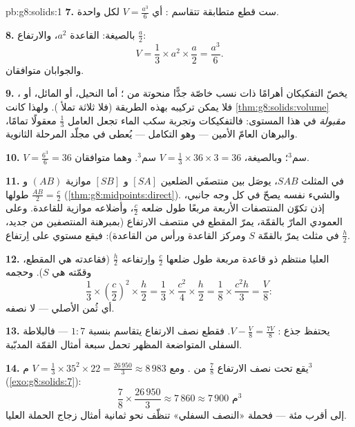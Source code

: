 \begin{solution}{pb:g8:solids:1}
\textbf{7.} ست قطع متطابقة تتقاسم :
أي $V = \frac{a^3}{6}$ لكل واحدة.

\textbf{8.} بالصيغة:  القاعدة $a^2$، والارتفاع $\frac a2$:
\[
V = \frac13 \times a^2 \times \frac{a}{2} = \frac{a^3}{6} .
\]
والجوابان متوافقان.

\textbf{9.} يخصّ التفكيكان أهرامًا ذات نسب
خاصّة جدًّا منحوتة من ؛ أما  النحيل، أو المائل،
أو ، فلا يمكن تركيبه بهذه الطريقة (فلا ثلاثة  تملأ
). ولهذا كانت \cref{thm:g8:solids:volume}
\emph{مقبولة} في هذا المستوى: فالتفكيكات وتجربة
سكب الماء تجعل العامل $\frac13$ معقولًا تمامًا،
والبرهان العامّ الأمين --- وهو التكامل --- يُعطى في
مجلّد المرحلة الثانوية.

\textbf{10.} $V = \frac{6^3}{6} = 36$ سم$^3$؛ وبالصيغة،
$V = \frac13 \times 36 \times 3 = 36$ سم$^3$. وهما متوافقان.

\textbf{11.} في المثلث $SAB$، يوصَل بين منتصفَي الضلعين
$[SA]$ و $[SB]$  موازية  $(AB)$ و
طولها $\frac{AB}{2} = \frac{c}{2}$
(\cref{thm:g8:midpoints:direct}). والشيء نفسه يصحّ في كل وجه
جانبي، إذن تكوّن المنتصفات الأربعة مربعًا طول ضلعه $\frac c2$،
وأضلاعه موازية للقاعدة. وعلى  العمودي المارّ
بالقمّة، يمرّ المقطع في منتصف الارتفاع (بمبرهنة
المنتصفين من جديد، في مثلث يمرّ بالقمّة $S$ ومركز القاعدة ورأس
من القاعدة): فيقع مستوي  على اِرتفاع $\frac h2$.

\textbf{12.}  العليا  منتظم ذو قاعدة مربعة طول
ضلعها $\frac c2$ واِرتفاعه $\frac h2$ (فقاعدته هي المقطع،
وقمّته هي $S$). وحجمه
\[
\frac13 \times \left(\frac c2\right)^2 \times \frac h2
= \frac13 \times \frac{c^2}{4} \times \frac h2
= \frac{1}{8} \times \frac{c^2 h}{3}
= \frac{V}{8} :
\]
أي ثُمن الأصلي --- لا نصفه.

\textbf{13.} يحتفظ جذع  :
$V - \frac V8 = \frac{7V}{8}$. فقطع نصف الارتفاع يتقاسم
 بنسبة $1 : 7$ --- فالبلاطة السفلى المتواضعة المظهر
تحمل سبعة أمثال  القمّة المدبّبة.

\textbf{14.} يقع تحت نصف الارتفاع $\frac78$ من . ومع
$V = \frac13 \times 35^2 \times 22 = \frac{26\,950}{3} \approx
8\,983$ م$^3$ (\cref{exo:g8:solids:7}):
\[
\frac78 \times \frac{26\,950}{3} \approx 7\,860 \approx
7\,900 \text{ م}^3
\]
إلى أقرب مئة --- فحملة «النصف السفلي» تنظّف
نحو ثمانية أمثال  زجاج الحملة العليا.


\end{solution}
